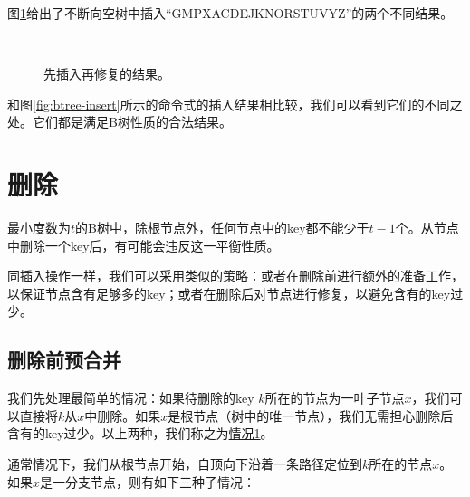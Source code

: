 \documentclass[UTF8]{article}
\begin{document}
图\ref{fig:btree-insert-fp}给出了不断向空树中插入“GMPXACDEJKNORSTUVYZ”的两个不同结果。

\begin{figure}[htbp]
  \centering
   \\
    \caption{先插入再修复的结果。} \label{fig:btree-insert-fp}
\end{figure}

和图\ref{fig:btree-insert}所示的命令式的插入结果相比较，我们可以看到它们的不同之处。它们都是满足B树性质的合法结果。


\section{删除}

最小度数为$t$的B树中，除根节点外，任何节点中的key都不能少于$t-1$个。从节点中删除一个key后，有可能会违反这一平衡性质。

同插入操作一样，我们可以采用类似的策略：或者在删除前进行额外的准备工作，以保证节点含有足够多的key；或者在删除后对节点进行修复，以避免含有的key过少。


\subsection{删除前预合并}

我们先处理最简单的情况：如果待删除的key $k$所在的节点为一叶子节点$x$，我们可以直接将$k$从$x$中删除。如果$x$是根节点（树中的唯一节点），我们无需担心删除后含有的key过少。以上两种，我们称之为\underline{情况1}。

通常情况下，我们从根节点开始，自顶向下沿着一条路径定位到$k$所在的节点$x$。如果$x$是一分支节点，则有如下三种子情况：
\end{document}
